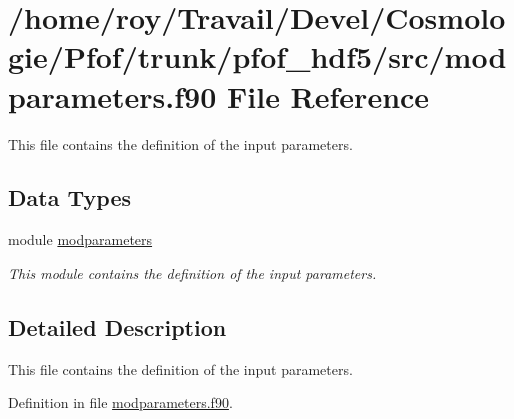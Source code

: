 \hypertarget{pfof__hdf5_2src_2modparameters_8f90}{\section{/home/roy/\-Travail/\-Devel/\-Cosmologie/\-Pfof/trunk/pfof\-\_\-hdf5/src/modparameters.f90 File Reference}
\label{pfof__hdf5_2src_2modparameters_8f90}
}


This file contains the definition of the input parameters.  


\subsection*{Data Types}
\begin{DoxyCompactItemize}
\item 
module \hyperlink{classmodparameters}{modparameters}
\begin{DoxyCompactList}\small\item\em This module contains the definition of the input parameters. \end{DoxyCompactList}\end{DoxyCompactItemize}


\subsection{Detailed Description}
This file contains the definition of the input parameters. 

Definition in file \hyperlink{pfof__hdf5_2src_2modparameters_8f90_source}{modparameters.\-f90}.

